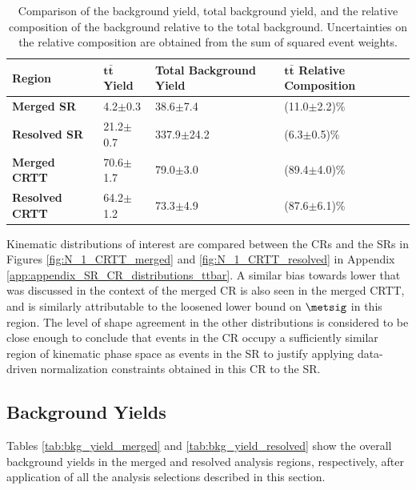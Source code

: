 \begin{table}[htbp]
    \centering
    \caption{Comparison of the \ttbar background yield, total background yield, and the relative composition of the \ttbar background relative to the total background. Uncertainties on the relative composition are obtained from the sum of squared event weights.}
    \begin{tabular}{l l l l}
      \toprule
     \textbf{Region} & \(\boldsymbol{t\bar{t}}\)\textbf{ Yield} & \textbf{Total Background Yield} & \(\boldsymbol{t\bar{t}}\)\textbf{ Relative Composition} \\
      \midrule
      \midrule
      \textbf{Merged SR} & 4.2\(\pm\)0.3 & 38.6\(\pm\)7.4 & (11.0\(\pm\)2.2)\%  \tabularnewline
      \midrule
      \textbf{Resolved SR} & 21.2\(\pm\)0.7 & 337.9\(\pm\)24.2 & (6.3\(\pm\)0.5)\% \tabularnewline
      \midrule
      \textbf{Merged CRTT} & 70.6\(\pm\)1.7 & 79.0\(\pm\)3.0 & (89.4\(\pm\)4.0)\% \tabularnewline
      \midrule
      \textbf{Resolved CRTT} & 64.2\(\pm\)1.2 & 73.3\(\pm\)4.9 & (87.6\(\pm\)6.1)\% \tabularnewline
      \bottomrule
    \end{tabular}
    \label{tab:ttbar_cr_yields}
\end{table}

Kinematic distributions of interest are compared between the \ttbar CRs and the SRs in Figures \ref{fig:N_1_CRTT_merged} and \ref{fig:N_1_CRTT_resolved} in Appendix \ref{app:appendix_SR_CR_distributions_ttbar}. A similar bias towards lower \met that was discussed in the context of the merged \wjets CR is also seen in the merged CRTT, and is similarly attributable to the loosened lower bound on \(\metsig\) in this region. The level of shape agreement in the other distributions is considered to be close enough to conclude that events in the \ttbar CR occupy a sufficiently similar region of kinematic phase space as events in the SR to justify applying data-driven \ttbar normalization constraints obtained in this CR to the SR.

\subsection{Background Yields}
\label{ap:bkg_yields}

Tables \ref{tab:bkg_yield_merged} and \ref{tab:bkg_yield_resolved} show the overall background yields in the merged and resolved analysis regions, respectively, after application of all the analysis selections described in this section.

